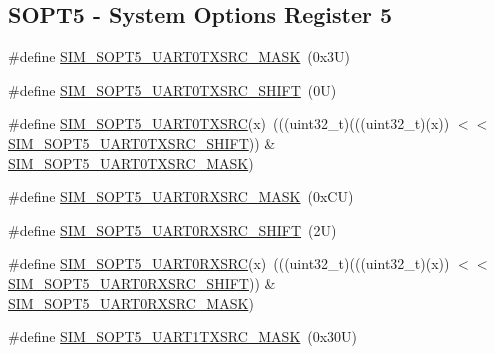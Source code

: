 \subsection*{S\+O\+P\+T5 -\/ System Options Register 5}
\begin{DoxyCompactItemize}
\item 
\#define \mbox{\hyperlink{group___s_i_m___register___masks_ga11646c1292cb7aab3128e1e563847e32}{S\+I\+M\+\_\+\+S\+O\+P\+T5\+\_\+\+U\+A\+R\+T0\+T\+X\+S\+R\+C\+\_\+\+M\+A\+SK}}~(0x3\+U)
\item 
\#define \mbox{\hyperlink{group___s_i_m___register___masks_ga0220b88df4a0747579d24b77f4db4e67}{S\+I\+M\+\_\+\+S\+O\+P\+T5\+\_\+\+U\+A\+R\+T0\+T\+X\+S\+R\+C\+\_\+\+S\+H\+I\+FT}}~(0\+U)
\item 
\#define \mbox{\hyperlink{group___s_i_m___register___masks_ga65e932e39703b2b18dea82ca440fc68f}{S\+I\+M\+\_\+\+S\+O\+P\+T5\+\_\+\+U\+A\+R\+T0\+T\+X\+S\+RC}}(x)~(((uint32\+\_\+t)(((uint32\+\_\+t)(x)) $<$$<$ \mbox{\hyperlink{group___s_i_m___register___masks_ga0220b88df4a0747579d24b77f4db4e67}{S\+I\+M\+\_\+\+S\+O\+P\+T5\+\_\+\+U\+A\+R\+T0\+T\+X\+S\+R\+C\+\_\+\+S\+H\+I\+FT}})) \& \mbox{\hyperlink{group___s_i_m___register___masks_ga11646c1292cb7aab3128e1e563847e32}{S\+I\+M\+\_\+\+S\+O\+P\+T5\+\_\+\+U\+A\+R\+T0\+T\+X\+S\+R\+C\+\_\+\+M\+A\+SK}})
\item 
\#define \mbox{\hyperlink{group___s_i_m___register___masks_ga6160de3cd4b7169ac9095c0d0eee46f7}{S\+I\+M\+\_\+\+S\+O\+P\+T5\+\_\+\+U\+A\+R\+T0\+R\+X\+S\+R\+C\+\_\+\+M\+A\+SK}}~(0x\+C\+U)
\item 
\#define \mbox{\hyperlink{group___s_i_m___register___masks_ga27e87f2f792b880bd156907ab20e9910}{S\+I\+M\+\_\+\+S\+O\+P\+T5\+\_\+\+U\+A\+R\+T0\+R\+X\+S\+R\+C\+\_\+\+S\+H\+I\+FT}}~(2\+U)
\item 
\#define \mbox{\hyperlink{group___s_i_m___register___masks_ga90e650c4ec5da3b971b3acdf511c466a}{S\+I\+M\+\_\+\+S\+O\+P\+T5\+\_\+\+U\+A\+R\+T0\+R\+X\+S\+RC}}(x)~(((uint32\+\_\+t)(((uint32\+\_\+t)(x)) $<$$<$ \mbox{\hyperlink{group___s_i_m___register___masks_ga27e87f2f792b880bd156907ab20e9910}{S\+I\+M\+\_\+\+S\+O\+P\+T5\+\_\+\+U\+A\+R\+T0\+R\+X\+S\+R\+C\+\_\+\+S\+H\+I\+FT}})) \& \mbox{\hyperlink{group___s_i_m___register___masks_ga6160de3cd4b7169ac9095c0d0eee46f7}{S\+I\+M\+\_\+\+S\+O\+P\+T5\+\_\+\+U\+A\+R\+T0\+R\+X\+S\+R\+C\+\_\+\+M\+A\+SK}})
\item 
\#define \mbox{\hyperlink{group___s_i_m___register___masks_gac473b632c382f785d524c177ff186e0d}{S\+I\+M\+\_\+\+S\+O\+P\+T5\+\_\+\+U\+A\+R\+T1\+T\+X\+S\+R\+C\+\_\+\+M\+A\+SK}}~(0x30\+U)

\end{DoxyCompactItemize}
